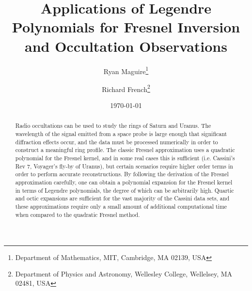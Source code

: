 \documentclass{article}
\title{%
    Applications of Legendre Polynomials for
    Fresnel Inversion and Occultation Observations%
}
\author{%
    Ryan Maguire\footnote{%
        Department of Mathematics,
        MIT, Cambridge, MA 02139, USA
    }
    \and
    Richard French\footnote{
        Department of Physics and Astronomy,
        Wellesley College, Wellelsey, MA 02481, USA
    }
}
\date{\today}
\begin{document}
    \maketitle
    \begin{abstract}
        Radio occultations can be used to study the rings of Saturn and
        Uranus. The wavelength of the signal emitted from a space probe is
        large enough that significant diffraction effects occur,
        and the data must be processed numerically in order to construct a
        meaningful ring profile. The classic Fresnel approximation uses a
        quadratic polynomial for the Fresnel kernel, and in some real cases
        this is sufficient (i.e. Cassini's Rev 7, Voyager's fly-by of Uranus),
        but certain scenarios require higher order terms in order to perform
        accurate reconstructions. By following the derivation of the
        Fresnel approximation carefully, one can obtain a polynomial expansion
        for the Fresnel kernel in terms of Legendre polynomials, the degree
        of which can be arbitrarily high. Quartic and octic
        expansions are sufficient for the vast majority of the Cassini data
        sets, and these approximations require only a small amount of
        additional computational time when compared to the quadratic Fresnel
        method.
    \end{abstract}
    \tableofcontents
\end{document}
